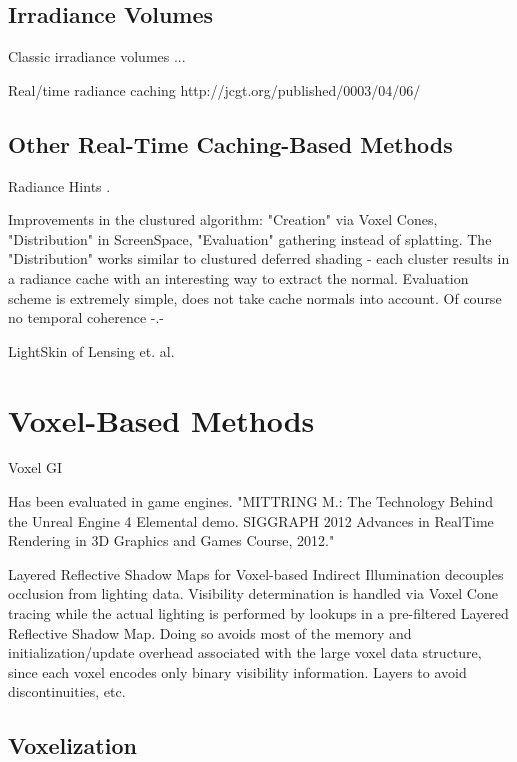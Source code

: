 \documentclass[thesis.tex]{subfiles}
\begin{document}
\subsection{Irradiance Volumes}

Classic irradiance volumes ...


Real/time radiance caching http://jcgt.org/published/0003/04/06/ \cite{bib:radiancecachechromaticcompression}


\subsection{Other Real-Time Caching-Based Methods}

Radiance Hints \cite{bib:radiancehints}.

Improvements in the clustured algorithm: "Creation" via Voxel Cones, "Distribution" in ScreenSpace, "Evaluation" gathering instead of splatting. The "Distribution" works similar to clustured deferred shading - each cluster results in a radiance cache with an interesting way to extract the normal. Evaluation scheme is extremely simple, does not take cache normals into account. Of course no temporal coherence -.-

LightSkin \cite{bib:LightskinPaper} of Lensing et. al.


\section{Voxel-Based Methods} \label{sec:prev:voxelmethods}

Voxel GI

 Has been evaluated in game engines. "MITTRING M.: The Technology Behind the Unreal Engine 4 Elemental demo. SIGGRAPH 2012 Advances in RealTime Rendering in 3D Graphics and Games Course, 2012." 

Layered Reflective Shadow Maps for Voxel-based Indirect Illumination decouples occlusion from lighting data.
Visibility determination is handled via Voxel Cone tracing while the actual lighting is performed by lookups in a pre-filtered Layered Reflective Shadow Map.
Doing so avoids most of the memory and initialization/update overhead associated with the large voxel data structure, since each voxel encodes only binary visibility information.
Layers to avoid discontinuities, etc.

\subsection{Voxelization}
\end{document}

